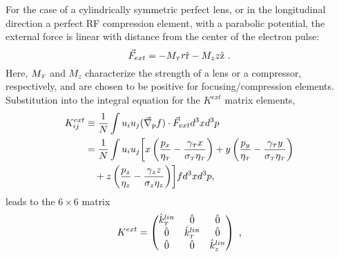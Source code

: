 
For the case of a cylindrically symmetric perfect lens, or in the longitudinal direction a perfect RF compression element, with a parabolic potential, the external force is linear with distance from the center of the electron pulse: 
\begin{equation} \label{eq:linear_force}
\vec{F}_{ext} = - M_{ {\scriptscriptstyle T} } r \hat{\operatorname{r}} - M_{z} z \hat{\operatorname{z}} \text{ .}
\end{equation}
Here, $M_{ {\scriptscriptstyle T} }$ and $M_{z}$ characterize the strength of a lens or a compressor, respectively, and are chosen to be positive for focusing/compression elements.
Substitution into the integral equation for the $ K^{ext} $ matrix elements,
\begin{equation}
 \begin{split} 
  K^{ext}_{ij} & \equiv \dfrac{1} {N} \int u_{i} u_{j} ( \vec{\nabla}_{p} f ) \cdot \vec{F}_{ext} d^{3} x d^{3} p \\ & = \dfrac{1} {N} \int u_{i} u_{j} \biggl[ x \left( \dfrac{ p_{x} } { \eta_{ {\scriptscriptstyle T} } } - \dfrac{ \gamma_{ {\scriptscriptstyle T} } x } { \sigma_{ {\scriptscriptstyle T} } \eta_{ {\scriptscriptstyle T} } } \right) + y \left( \dfrac{ p_{y} } { \eta_{ {\scriptscriptstyle T} } } - \dfrac{ \gamma_{ {\scriptscriptstyle T} } y } { \sigma_{ {\scriptscriptstyle T} } \eta_{ {\scriptscriptstyle T} } } \right) \\ & \quad + z \left( \dfrac{ p_{z} } { \eta_{z} } - \dfrac{ \gamma_{z} z } { \sigma_{z} \eta_{z} } \right) \biggr] f d^{3} x d^{3} p ,
 \end{split}
\end{equation}
leads to the $6\times6$ matrix
\begin{equation}
K^{ext} = 
\begin{pmatrix}
\hat{k}^{lin}_{{\scriptscriptstyle T}} & \hat{0} & \hat{0} \\
\hat{0} & \hat{k}^{lin}_{{\scriptscriptstyle T}} & \hat{0} \\
\hat{0} & \hat{0} & \hat{k}^{lin}_{z}
\end{pmatrix} \text{ ,}
\end{equation}
